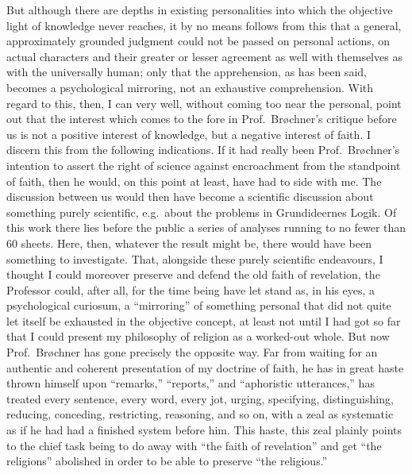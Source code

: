 \documentclass[12pt]{book}
\newcommand{\opage}[1]{\marginnote{\footnotesize\textit{[#1]}}}
\begin{document}
But although there are depths in existing personalities into which the
objective light of knowledge never reaches,
\opage{46}\setcounter{footnote}{0}%
it by no means follows from this that a general, approximately grounded
judgment could not be passed on personal actions, on actual characters and
their greater or lesser agreement as well with themselves as with the
universally human; only that the apprehension, as has been said, becomes a
psychological mirroring, not an exhaustive comprehension. With regard to
this, then, I can very well, without coming too near the personal, point out
that the interest which comes to the fore in Prof.\ Brøchner's critique
before us is not a positive interest of knowledge, but a negative interest
of faith. I discern this from the following indications. If it had really
been Prof.\ Brøchner's intention to assert the right of science against
encroachment from the standpoint of faith, then he would, on this point at
least, have had to side with me. The discussion between us would then have
become a scientific discussion about something purely scientific, e.g.\
about the problems in Grundideernes Logik. Of this work there lies before
the public a series of analyses running to no fewer than 60 sheets. Here,
then, whatever the result might be, there would have been something to
investigate. That, alongside these purely scientific endeavours, I thought I
could moreover preserve and defend the old faith of revelation, the
Professor could, after all, for the time being have let stand as, in his
eyes, a psychological curiosum, a ``mirroring'' of something personal that
did not quite let itself be exhausted in the objective concept, at least
not until I had got so far that I could present my philosophy of religion as
a worked-out whole. But now Prof.\ Brøchner has gone precisely the opposite
way. Far from waiting for an authentic and coherent presentation of my
doctrine of faith, he has in great haste thrown himself upon ``remarks,''
``reports,'' and ``aphoristic
\opage{47}\setcounter{footnote}{0}%
utterances,'' has treated every sentence, every word, every jot, urging,
specifying, distinguishing, reducing, conceding, restricting, reasoning, and
so on, with a zeal as systematic as if he had had a finished system before
him. This haste, this zeal plainly points to the chief task being to do
away with ``the faith of revelation'' and get ``the religions'' abolished in
order to be able to preserve ``the religious.''
\end{document}
